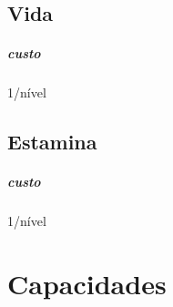 \section{Vida}
\paragraph{custo} 1/nível
%
%
\section{Estamina}
\paragraph{custo} 1/nível 
%
%
%
%
\clearpage{}
\chapter{Capacidades}
\clearpage{}
\chapter{}


